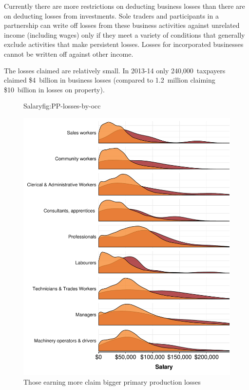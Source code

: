 \documentclass{grattan}\usepackage[]{graphicx}\usepackage[]{color}
\begin{document}
Currently there are more restrictions on deducting business losses than there are on deducting losses from investments. Sole traders and participants in a partnership can write off losses from these business activities against unrelated income (including wages) only if they meet a variety of conditions that generally exclude activities that make persistent losses.  Losses for incorporated businesses cannot be written off against other income. 





The losses claimed are relatively small. In 2013-14 only 240,000~taxpayers claimed \$4~billion in business losses (compared to 1.2~million claiming \$10~billion in losses on property).

\TBD{\dots}



\begin{figure}
\caption{Those earning more claim bigger primary production losses}{Salary}{fig:PP-losses-by-occ}






\includegraphics[width=\columnwidth]{CGT-NG-atlas//density-salary-by-PP-losses-1}
\end{figure}
\end{document}
